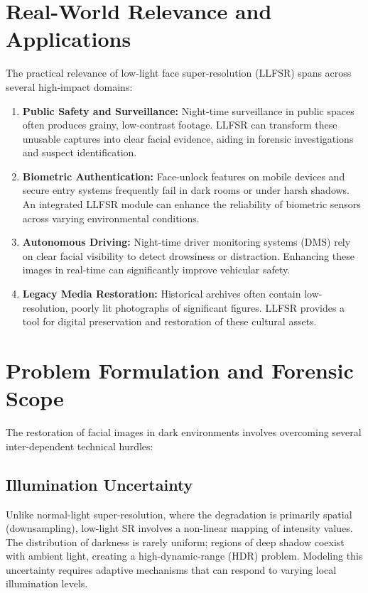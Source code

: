 \section{Real-World Relevance and Applications}
The practical relevance of low-light face super-resolution (LLFSR) spans across several high-impact domains:

\begin{enumerate}
    \item \textbf{Public Safety and Surveillance:} Night-time surveillance in public spaces often produces grainy, low-contrast footage. LLFSR can transform these unusable captures into clear facial evidence, aiding in forensic investigations and suspect identification.
    \item \textbf{Biometric Authentication:} Face-unlock features on mobile devices and secure entry systems frequently fail in dark rooms or under harsh shadows. An integrated LLFSR module can enhance the reliability of biometric sensors across varying environmental conditions.
    \item \textbf{Autonomous Driving:} Night-time driver monitoring systems (DMS) rely on clear facial visibility to detect drowsiness or distraction. Enhancing these images in real-time can significantly improve vehicular safety.
    \item \textbf{Legacy Media Restoration:} Historical archives often contain low-resolution, poorly lit photographs of significant figures. LLFSR provides a tool for digital preservation and restoration of these cultural assets.
\end{enumerate}

\section{Problem Formulation and Forensic Scope}
The restoration of facial images in dark environments involves overcoming several inter-dependent technical hurdles:

\subsection{Illumination Uncertainty}
Unlike normal-light super-resolution, where the degradation is primarily spatial (downsampling), low-light SR involves a non-linear mapping of intensity values. The distribution of darkness is rarely uniform; regions of deep shadow coexist with ambient light, creating a high-dynamic-range (HDR) problem. Modeling this uncertainty requires adaptive mechanisms that can respond to varying local illumination levels.

